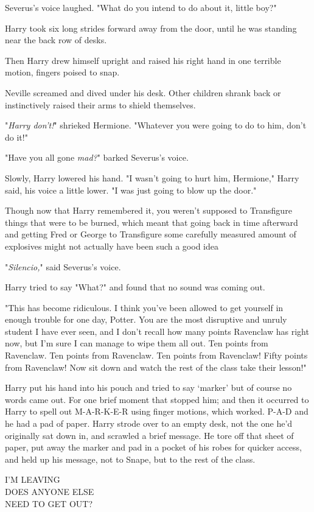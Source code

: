 Severus's voice laughed. "What do you intend to do about it, little boy?"

Harry took six long strides forward away from the door, until he was standing
near the back row of desks.

Then Harry drew himself upright and raised his right hand in one terrible
motion, fingers poised to snap.

Neville screamed and dived under his desk. Other children shrank back or
instinctively raised their arms to shield themselves.

"\emph{Harry don't!}" shrieked Hermione. "Whatever you were going to do to him,
don't do it!"

"Have you all gone \emph{mad?}" barked Severus's voice.

Slowly, Harry lowered his hand. "I wasn't going to hurt him, Hermione," Harry
said, his voice a little lower. "I was just going to blow up the door."

Though now that Harry remembered it, you weren't supposed to Transfigure things
that were to be burned, which meant that going back in time afterward and
getting Fred or George to Transfigure some carefully measured amount of
explosives might not actually have been such a good idea{\el}

"\emph{Silencio,}" said Severus's voice.

Harry tried to say "What?" and found that no sound was coming out.

"This has become ridiculous. I think you've been allowed to get yourself in
enough trouble for one day, Potter. You are the most disruptive and unruly
student I have ever seen, and I don't recall how many points Ravenclaw has
right now, but I'm sure I can manage to wipe them all out. Ten points from
Ravenclaw. Ten points from Ravenclaw. Ten points from Ravenclaw! Fifty points
from Ravenclaw! Now sit down and watch the rest of the class take their lesson!"

Harry put his hand into his pouch and tried to say `marker' but of course no
words came out. For one brief moment that stopped him; and then it occurred to
Harry to spell out M-A-R-K-E-R using finger motions, which worked. P-A-D and he
had a pad of paper. Harry strode over to an empty desk, not the one he'd
originally sat down in, and scrawled a brief message. He tore off that sheet of
paper, put away the marker and pad in a pocket of his robes for quicker access,
and held up his message, not to Snape, but to the rest of the class.

\begin{writtenNote}
I'M LEAVING\\
DOES ANYONE ELSE\\
NEED TO GET OUT?
\end{writtenNote}

